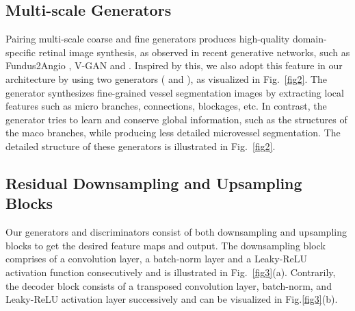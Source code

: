 \documentclass[runningheads]{llncs}
\begin{document}
\subsection{Multi-scale Generators}
\label{subsec:generators}
Pairing multi-scale coarse and fine generators produces high-quality domain-specific retinal image synthesis, as observed in recent generative networks, such as Fundus2Angio \cite{kamran2020fundus2angio}, V-GAN \cite{son2017retinal} and \cite{tavakkoli2020novel}. Inspired by this, we also adopt this feature in our architecture by using two generators ( and ), as visualized in Fig.~\ref{fig2}. The generator  synthesizes fine-grained vessel segmentation images by extracting local features such as micro branches, connections, blockages, etc. In contrast, the generator  tries to learn and conserve global information, such as the structures of the maco branches, while producing less detailed microvessel segmentation. \iffalse The generators consist of multiple downsampling, upsampling, spatial-aggregation blocks, residual identity blocks, and a feature appending block between the fine and coarse generators. \fi The detailed structure of these generators is illustrated in Fig.~\ref{fig2}. 

\subsection{Residual Downsampling and Upsampling Blocks}
\label{subsec:encdec}
Our generators and discriminators consist of both downsampling and upsampling blocks to get the desired feature maps and output. The downsampling block comprises of a convolution layer, a batch-norm layer and a Leaky-ReLU activation function consecutively and is illustrated in Fig.~\ref{fig3}(a). Contrarily, the decoder block consists of a transposed convolution layer, batch-norm, and Leaky-ReLU activation layer successively and can be visualized in  Fig.\ref{fig3}(b). 
\end{document}
